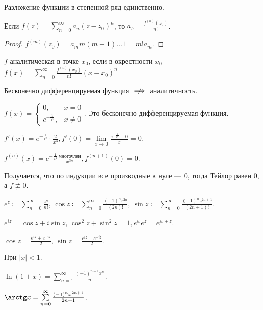 \begin{theorem}
    Разложение функции в степенной ряд единственно. 

    Если $f(z) = \sum\limits_{n=0}^\infty a_n(z-z_0)^n$, то $a_b = \frac{f^{(n)}(z_0)}{n!}$.
\end{theorem}
\begin{proof}
    $f^{(m)}(z_0) = a_m m(m-1)\ldots 1 = m!a_m$.
\end{proof}
\begin{definition}
    $f$ аналитическая в точке  $x_0$, если в окрестности $x_0$ $f(x) = \sum\limits_{n=0}^\infty \frac{f^{(n)}(x_0)}{n!}(x-x_0)^n$
\end{definition}
\begin{remark}
    Бесконечно дифференцируемая функция $\centernot\implies$ аналитичность. 
\end{remark}
\begin{example}
    $f(x) = \begin{cases} 0, & x = 0\\e^{-\frac{1}{x^2}}, & x \neq 0 \end{cases}$. Это бесконечно дифференцируемая функция. 

    $f'(x) = e^{-\frac{1}{x^2}} \cdot \frac{2}{x^3}, f'(0) = \lim\limits_{x \to 0} \frac{e^{-\frac{1}{x^2}} - 0}{x} = 0$.

    $f^{(n)}(x) = e^{-\frac{1}{x^2}} \frac{\text{многочлен}}{x^{3n}}, f^{(n+1)}(0) = 0$.

    Получается, что по индукции все производные в нуле --- 0, тогда Тейлор равен 0, а $f \not \equiv 0$.
\end{example}
\begin{example}
    $e^z \coloneqq \sum\limits_{n=0}^\infty \frac{z^n}{n!}$, $\cos z \coloneqq \sum\limits_{n=0}^\infty \frac{(-1)^n z^{2n}}{(2n)!}$, $\sin z \coloneqq \sum\limits_{n=0}^\infty \frac{(-1)^n z^{2n+1}}{(2n+1)!}$.
\end{example}
\begin{exerc}
    $e^{iz} = \cos z + i\sin z$,  $\cos^2 z + \sin^2 z = 1, e^w e^z = e^{w+z}$.

    $\cos z = \frac{e^{iz} + e^{-iz}}{2}$, $\sin z = \frac{e^{iz} - e^{-iz}}{2}$.
\end{exerc}
\begin{example}
    При $|x| < 1$.

    $\ln(1+x) = \sum\limits_{n=1}^\infty \frac{(-1)^{n-1}x^n}{n}$.

    $\arctg x = \sum\limits_{n=0}^\infty \frac{(-1)^n x^{2n+1}}{2n+1}$.
\end{example}
